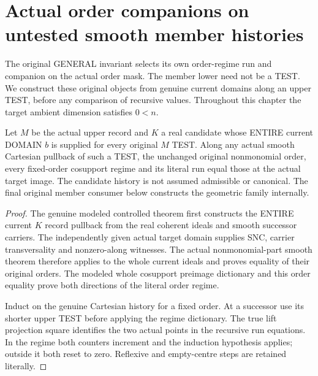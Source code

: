 \section{Actual order companions on untested smooth member histories}

The original GENERAL invariant selects its own order-regime run and
companion on the actual order mask. The member lower need not be a TEST.
We construct these original objects from genuine current domains along
an upper TEST, before any comparison of recursive values.
Throughout this chapter the target ambient dimension satisfies $0<n$.

\begin{theorem}
\label{hir:original-untested-modeled-order-smooth-run}
\leanok
Let $M$ be the actual upper record and $K$ a real candidate whose ENTIRE
current DOMAIN $b$ is supplied for every original $M$ TEST. Along any
actual smooth Cartesian pullback of such a TEST, the unchanged original
nonmonomial order, every fixed-order cosupport regime and its literal
run equal those at the actual target image. The candidate history is
not assumed admissible or canonical. The final original member consumer
below constructs the geometric family internally.
\end{theorem}
\begin{proof}
The genuine modeled controlled theorem first constructs the ENTIRE
current $K$ record pullback from the real coherent ideals and smooth
successor carriers. The independently given actual target domain
supplies SNC, carrier transversality and nonzero-along witnesses.
The actual nonmonomial-part smooth theorem therefore applies to the
whole current ideals and proves equality of their original orders.
The modeled whole cosupport preimage dictionary and this order equality
prove both directions of the literal order regime.

Induct on the genuine Cartesian history for a fixed order. At a
successor use its shorter upper TEST before applying the regime
dictionary. The true lift projection square identifies the two actual
points in the recursive run equations. In the regime both counters
increment and the induction hypothesis applies; outside it both reset
to zero. Reflexive and empty-centre steps are retained literally.
\end{proof}

